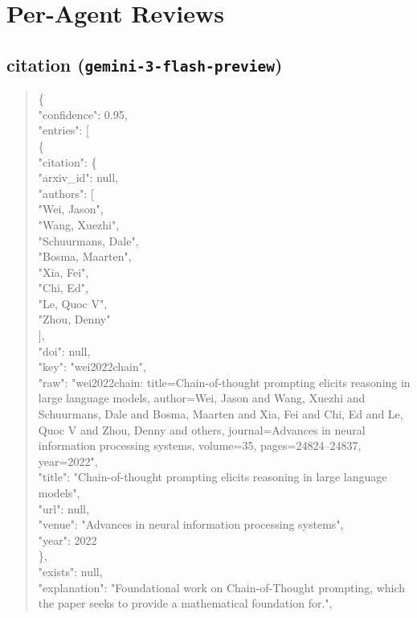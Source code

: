 \documentclass[11pt]{article}
\begin{document}
\section*{Per-Agent Reviews}
\subsection*{citation (\texttt{gemini-3-flash-preview})}
\begin{quote}\small\ttfamily\raggedright
\{\\
  "confidence": 0.95,\\
  "entries": [\\
    \{\\
      "citation": \{\\
        "arxiv\_id": null,\\
        "authors": [\\
          "Wei, Jason",\\
          "Wang, Xuezhi",\\
          "Schuurmans, Dale",\\
          "Bosma, Maarten",\\
          "Xia, Fei",\\
          "Chi, Ed",\\
          "Le, Quoc V",\\
          "Zhou, Denny"\\
        ],\\
        "doi": null,\\
        "key": "wei2022chain",\\
        "raw": "wei2022chain: title=Chain-of-thought prompting elicits reasoning in large language models, author=Wei, Jason and Wang, Xuezhi and Schuurmans, Dale and Bosma, Maarten and Xia, Fei and Chi, Ed and Le, Quoc V and Zhou, Denny and others, journal=Advances in neural information processing systems, volume=35, pages=24824--24837, year=2022",\\
        "title": "Chain-of-thought prompting elicits reasoning in large language models",\\
        "url": null,\\
        "venue": "Advances in neural information processing systems",\\
        "year": 2022\\
      \},\\
      "exists": null,\\
      "explanation": "Foundational work on Chain-of-Thought prompting, which the paper seeks to provide a mathematical foundation for.",\\

\end{quote}
\end{document}
